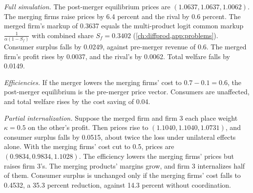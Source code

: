 \begin{example}
\emph{Full simulation.} The post-merger equilibrium prices are $(1.0637, 1.0637, 1.0062)$. The merging firms raise
prices by 6.4 percent and the rival by 0.6 percent. The merged firm's markup of 0.3637 equals the multi-product logit
common markup $\frac{1}{\alpha(1 - S_f)}$ with combined share $S_f = 0.3402$ (\cref{ch:diffprod,app:problems}). Consumer
surplus falls by 0.0249, against pre-merger revenue of 0.6. The merged firm's profit rises by 0.0037, and the rival's by
0.0062. Total welfare falls by 0.0149.

\emph{Efficiencies.} If the merger lowers the merging firms' cost to $0.7 - 0.1 = 0.6$, the post-merger equilibrium is
the pre-merger price vector. Consumers are unaffected, and total welfare rises by the cost saving of 0.04.

\emph{Partial internalization.} Suppose the merged firm and firm 3 each place weight $\kappa = 0.5$ on the other's
profit. Then prices rise to $(1.1040, 1.1040, 1.0731)$, and consumer surplus falls by 0.0515, about twice the loss
under unilateral effects alone. With the merging firms' cost cut to 0.5, prices are $(0.9834, 0.9834, 1.1028)$. The
efficiency lowers the merging firms' prices but raises firm 3's. The merging products' margins grow, and firm 3
internalizes half of them. Consumer surplus is unchanged only if the merging firms' cost falls to 0.4532, a 35.3
percent reduction, against 14.3 percent without coordination.
\end{example}

